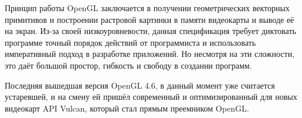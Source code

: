 Принцип работы  OpenGL заключается в получении геометрических векторных примитивов и построении растровой картинки в памяти видеокарты и выводе её на экран. Из-за своей низкоуровневости, данная спецификация требует диктовать программе точный порядок действий от программиста и использовать императивный подход в разработке приложений. Но несмотря на эти сложности, это даёт большой простор, гибкость и свободу в создании программ.

Последняя вышедшая версия OpenGL 4.6, в данный момент уже считается устаревшей, и на смену ей пришёл современный и оптимизированный для новых видеокарт API Vulcan, который стал прямым преемником OpenGL.